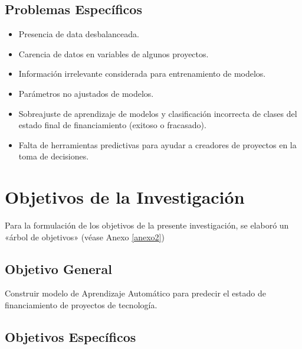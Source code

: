 \subsection{Problemas Espec\'{i}ficos}
\newcommand{\Pbone}{
Presencia de data desbalanceada.
}
\newcommand{\Pbtwo}{
Carencia de datos en variables de algunos proyectos.
}
\newcommand{\Pbthree}{
Información irrelevante considerada para entrenamiento de modelos.
}
\newcommand{\Pbfour}{
Parámetros no ajustados de modelos.
}
\newcommand{\Pbfive}{
Sobreajuste de aprendizaje de modelos y clasificación incorrecta de clases del estado final de financiamiento (exitoso o fracasado).
}
\newcommand{\Pbsix}{
Falta de herramientas predictivas para ayudar a creadores de proyectos en la toma de decisiones.
}

\begin{itemize}
	\item {\Pbone}
	\item {\Pbtwo}
	\item {\Pbthree}
	\item {\Pbfour}
	\item {\Pbfive}
	\item {\Pbsix}
\end{itemize}

\section{Objetivos de la Investigación}
Para la formulación de los objetivos de la presente investigación, se elaboró un «árbol de objetivos» (véase Anexo \ref{anexo2}) 
\subsection{Objetivo General}
\newcommand{\ObjetivoGeneral}{
Construir modelo de Aprendizaje Automático para predecir el estado de financiamiento de proyectos de tecnología.
}
\ObjetivoGeneral
\subsection{Objetivos Espec\'{i}ficos}
\newcommand{\Objone}{
Utilizar técnicas de Machine Learning para trabajar con data desbalanceada.
}
\newcommand{\Objtwo}{
Imputar datos faltantes o incompletos de proyectos.
}
\newcommand{\Objthree}{
Definir información relevante para entrenamiento de modelos.
}
\newcommand{\Objfour}{
Ajustar parámetros de modelos.
}
\newcommand{\Objfive}{
Evitar sobreajuste de aprendizaje del modelo y clasificación incorrecta de clases del estado final de financiamiento (exitoso o fracasado).
}
\newcommand{\Objsix}{
Ofrecer herramienta analítica y predictiva a creadores de proyectos para ayudar en la toma de decisiones.
}

